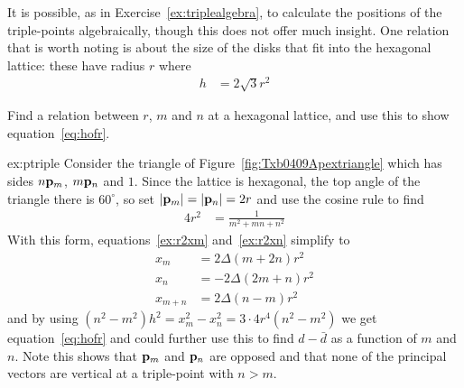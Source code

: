 It is possible, as in Exercise~\ref{ex:triplealgebra}, to calculate the positions of the triple-points algebraically, though this does not offer much insight.
One relation that is worth noting is about the size of the disks that fit into the hexagonal lattice: these 
have radius $r$ where
\begin{align}
	h &= 2\sqrt{3} r^2  \label{eq:hofr}
\end{align}
\begin{jExercise}\label{ex:ptriple} 
	\label{ex:triplealgebra}
	Find a relation between $r$, $m$ and $n$ at a hexagonal lattice, and use this to show equation~\eqref{eq:hofr}.
\end{jExercise}
\begin{jAnswer}{ex:ptriple}
Consider the triangle of Figure~\ref{fig:Txb0409Apextriangle} which has sides $n{\mathbf p}_{m}$, $m{\mathbf p}_{n}$ and $1$. Since the lattice is hexagonal, the top angle of the triangle there is $60^\circ$, so set $|{\mathbf p}_{m}|=|{\mathbf p}_{n}|=2r$ and use the cosine rule to find   
\begin{align*}
	4 r^2  &=  \frac{1}{m^2+mn + n^2} \label{eq:cosine}
\end{align*}
With this form, equations~\eqref{ex:r2xm} and~\eqref{ex:r2xn} simplify to 
\begin{align*}
	x_m 
	&= 2\Delta(m+2n) r^2
	\\
	x_n &= -2 \Delta (2m+n) r^2
	\\
	x_{m+n} &=  2  \Delta(n-m) r^2
\end{align*}
and by using $(n^2-m^2)h^2=x^2_m-x^2_n=3\cdot 4 r^4 (n^2-m^2)$ we get equation~\eqref{eq:hofr} and could further use this to find $d-\bar{d}$ as a function of $m$ and $n$. Note this shows that ${\mathbf p}_{m}$ and ${\mathbf p}_{n}$ are opposed and that none of the principal vectors are vertical at a triple-point with $n>m$. 
\end{jAnswer} 






